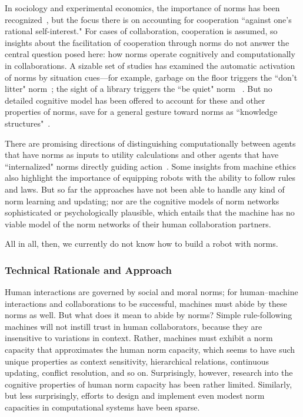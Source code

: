 \documentclass[12pt]{article}
\begin{document}
In sociology and experimental economics, the importance of norms has 
been recognized~\citep{krupka09}, but the focus there is on accounting for 
cooperation ``against one's rational self-interest."  For cases of 
collaboration, cooperation is assumed, so insights about the facilitation of 
cooperation through norms do not answer the central question posed here: 
how norms operate cognitively and computationally in collaborations.  A 
sizable set of studies has examined the automatic activation of norms by 
situation cues---for example, garbage on the floor triggers the ``don't litter" 
norm~\citep{cialdini91}; the sight of a library triggers the ``be quiet" norm~
\citep{aarts03}.  But no detailed cognitive model has been offered to account 
for these and other properties of norms, save for a general gesture toward 
norms as ``knowledge structures"~\citep{harvey81,aarts03}.  

There are promising directions of distinguishing computationally between agents that have norms as inputs to utility calculations and other agents that have ``internalized" norms  directly guiding action~\citep{andrigh10}.  
Some insights from machine ethics~\citep{arkin09,anderson11} also highlight the importance of equipping robots with the ability to follow rules and laws.  But so far the approaches have not been able to handle any kind of norm learning and updating; nor are the cognitive models of norm networks sophisticated or psychologically plausible, which entails that the machine has no viable model of the norm networks of their human collaboration partners.  

All in all, then, we currently do not know how to build a robot with norms.  
 
\subsubsection*{Technical Rationale and Approach}

\noindent Human interactions are governed by social and moral
norms; for human--machine interactions and collaborations to be
successful, machines must abide by these norms as well. But what does it mean
to abide by norms?  Simple rule-following machines will not instill
trust in human collaborators, because they are insensitive to
variations in context.  Rather, machines must exhibit a norm capacity
that approximates the human norm capacity, which seems to have such
unique properties as context sensitivity, hierarchical relations,
continuous updating, conflict resolution, and so on.  Surprisingly,
however, research into the cognitive properties of human norm capacity
has been rather limited. Similarly, but less surprisingly, efforts to
design and implement even modest norm capacities in computational
systems have been sparse.
\end{document}
